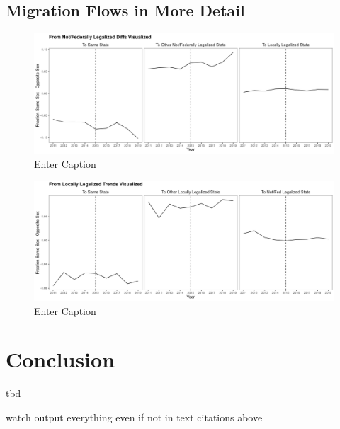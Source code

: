 \documentclass[12pt,letterpaper]{article}
\begin{document}


\subsection{Migration Flows in More Detail}
\clearpage
\begin{figure}
    \centering
    \includegraphics[width=1\linewidth]{outputs/summary_stats/from_fed_diffs.png}
    \caption{Enter Caption}
    \label{fig:enter-label}
\end{figure}

\begin{figure}
    \centering
    \includegraphics[width=1\linewidth]{outputs/summary_stats/from_local_diffs.png}
    \caption{Enter Caption}
    \label{fig:enter-label}
\end{figure}

\begin{landscape}
\begin{tiny}

\end{tiny}
\end{landscape}
\begin{landscape}
\begin{tiny}

\end{tiny}
\end{landscape}

\section{Conclusion}
tbd

\newpage


watch output everything even if not in text citations above
\end{document}
